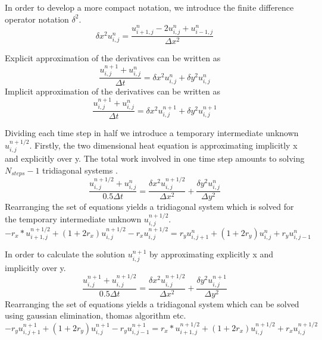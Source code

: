 \documentclass[12pt, oneside]{book}
\theoremstyle{plain}
\theoremstyle{definition}
\begin{document}
In order to develop a more compact notation, we introduce the finite difference operator notation $\delta^2$.
\begin{equation}
\delta x^2 u^{n}_{i,j}  = \frac{u^{n}_{i+1,j} - 2u^{n}_{i,j} + u^{n}_{i-1,j}}{\Delta x^2}
\end{equation}

Explicit approximation of the derivatives can be written as
\begin{equation}
\frac{u^{n+1}_{i,j} + u^{n}_{i,j}}{\Delta t} = \delta x^2 u^{n}_{i,j} + \delta y^2 u^{n}_{i,j}
\end{equation}
Implicit  approximation of the derivatives can be written as
\begin{equation}
\frac{u^{n+1}_{i,j} + u^{n}_{i,j}}{\Delta t} = \delta x^2 u^{n+1}_{i,j} + \delta y^2 u^{n+1}_{i,j}
\end{equation}

Dividing each time step in half we introduce a temporary intermediate unknown $u^{n+1/2}_{i,j}$. Firstly, the two dimensional heat equation is approximating implicitly x and explicitly over y. The total work involved in one time step amounts to solving $ N_{steps} - 1$ tridiagonal systems \cite{morton}. 
\begin{equation}
\frac{u^{n+1/2}_{i,j} + u^{n}_{i,j}}{0.5 \Delta t} = \frac{\delta x^2 u^{n+1/2}_{i,j} }{\Delta x^2} + \frac{\delta y^2 u^{n}_{i,j}}{\Delta y^2}
\end{equation}
Rearranging the set of equations yields a tridiagonal system which is solved for the temporary intermediate unknown $u^{n+1/2}_{i,j}$.
\begin{equation}
- r_x * u^{n+1/2}_{i+1,j} + (1 + 2r_x) u^{n+1/2}_{i,j}  - r_x u^{n+1/2}_{i,j}  = r_y u^{n}_{i,j+1} + (1 + 2r_y) u^{n}_{i,j} + r_y u^{n}_{i,j-1}
\end{equation}

In order to calculate the solution $u^{n+1}_{i,j}$ by approximating explicitly x and implicitly over y.
\begin{equation}
\frac{u^{n+1}_{i,j} + u^{n+1/2}_{i,j}}{0.5 \Delta t} = \frac{\delta x^2 u^{n+1/2}_{i,j} }{\Delta x^2} + \frac{\delta y^2 u^{n+1}_{i,j}}{\Delta y^2}
\end{equation}
Rearranging the set of equations yields a tridiagonal system which can be solved using gaussian elimination, thomas algorithm etc.
\begin{equation}
-r_y u^{n+1}_{i,j+1} + (1 + 2r_y) u^{n+1}_{i,j} - r_y u^{n+1}_{i,j-1} = r_x * u^{n+1/2}_{i+1,j} + (1 + 2r_x) u^{n+1/2}_{i,j} + r_x u^{n+1/2}_{i,j}
\end{equation}
\end{document}
